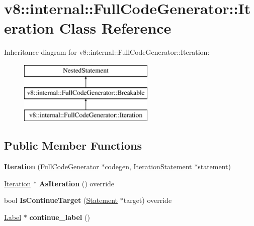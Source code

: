 \hypertarget{classv8_1_1internal_1_1_full_code_generator_1_1_iteration}{}\section{v8\+:\+:internal\+:\+:Full\+Code\+Generator\+:\+:Iteration Class Reference}
\label{classv8_1_1internal_1_1_full_code_generator_1_1_iteration}
Inheritance diagram for v8\+:\+:internal\+:\+:Full\+Code\+Generator\+:\+:Iteration\+:\begin{figure}[H]
\begin{center}
\leavevmode
\includegraphics[height=3.000000cm]{classv8_1_1internal_1_1_full_code_generator_1_1_iteration}
\end{center}
\end{figure}
\subsection*{Public Member Functions}
\begin{DoxyCompactItemize}
\item 
{\bfseries Iteration} (\hyperlink{classv8_1_1internal_1_1_full_code_generator}{Full\+Code\+Generator} $\ast$codegen, \hyperlink{classv8_1_1internal_1_1_iteration_statement}{Iteration\+Statement} $\ast$statement)\hypertarget{classv8_1_1internal_1_1_full_code_generator_1_1_iteration_a5a0df63f8deb321db3c4a96c15c655bb}{}\label{classv8_1_1internal_1_1_full_code_generator_1_1_iteration_a5a0df63f8deb321db3c4a96c15c655bb}

\item 
\hyperlink{classv8_1_1internal_1_1_full_code_generator_1_1_iteration}{Iteration} $\ast$ {\bfseries As\+Iteration} () override\hypertarget{classv8_1_1internal_1_1_full_code_generator_1_1_iteration_a428dec08b2189aef1cd42cbc03f5febf}{}\label{classv8_1_1internal_1_1_full_code_generator_1_1_iteration_a428dec08b2189aef1cd42cbc03f5febf}

\item 
bool {\bfseries Is\+Continue\+Target} (\hyperlink{classv8_1_1internal_1_1_statement}{Statement} $\ast$target) override\hypertarget{classv8_1_1internal_1_1_full_code_generator_1_1_iteration_afded0e0b409c3c28b38ce860b10d0fee}{}\label{classv8_1_1internal_1_1_full_code_generator_1_1_iteration_afded0e0b409c3c28b38ce860b10d0fee}

\item 
\hyperlink{classv8_1_1internal_1_1_label}{Label} $\ast$ {\bfseries continue\+\_\+label} ()\hypertarget{classv8_1_1internal_1_1_full_code_generator_1_1_iteration_a5e859f5d0b43f9e3fb847ce6f9586bb3}{}\label{classv8_1_1internal_1_1_full_code_generator_1_1_iteration_a5e859f5d0b43f9e3fb847ce6f9586bb3}

\end{DoxyCompactItemize}
